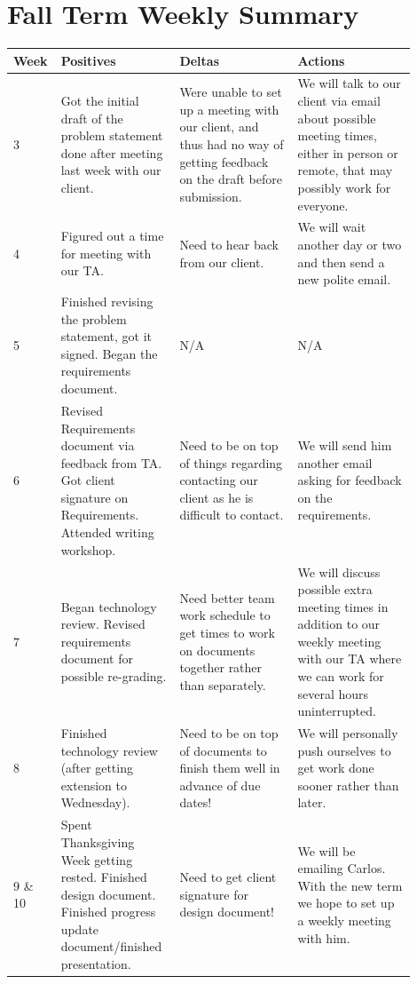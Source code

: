 \documentclass[onecolumn, draftclsnofoot,10pt, compsoc]{IEEEtran}
\begin{document}
\section{Fall Term Weekly Summary}

\begin{tabular}{|p{0.05\linewidth}|p{0.285\linewidth}|p{0.285\linewidth}|p{0.285\linewidth}|}
\hline 
Week & Positives & Deltas & Actions \\ \hline

	3 
	& Got the initial draft of the problem statement done after meeting last 
	week with our client. 
	& Were unable to set up a meeting with our client, and thus had no way of 
	getting feedback on the draft before submission. 
	& We will talk to our client via email about possible meeting times, either 
	in person or remote, that may possibly work for everyone. \\ \hline

	4 
	& Figured out a time for meeting with our TA. 
	& Need to hear back from our client. 
	& We will wait another day or two and then send a new polite email. \\ \hline

	5 
	& Finished revising the problem statement, got it signed. 
		Began the requirements document. 
	& N/A 
	& N/A\\ \hline

	6 
	& Revised Requirements document via feedback from TA. Got client signature on Requirements. 
		Attended writing workshop. 
	& Need to be on top of things regarding contacting our client as 
		he is difficult to contact. 
	& We will send him another email asking for feedback on the requirements. \\ \hline

	7 
	& Began technology review. Revised requirements document for possible re-grading. 
	& Need better team work schedule to get times to work on documents 
	together rather than separately. 
	& We will discuss possible extra meeting times in addition to our weekly meeting 
	with our TA where we can work for several hours uninterrupted. \\ \hline

	8 
	& Finished technology review (after getting extension to Wednesday). 
	& Need to be on top of documents to finish them well in advance of due dates! 
	& We will personally push ourselves to get work done sooner rather than later. \\ \hline


	9 \hspace{3mm} \& 10 
	& Spent Thanksgiving Week getting rested. Finished design document. 
		Finished progress update document/finished presentation. 
	& Need to get client signature for design document! 
	& We will be emailing Carlos. With the new term we hope 
		to set up a weekly meeting with him.  \\ \hline

\end{tabular}
\end{document}
